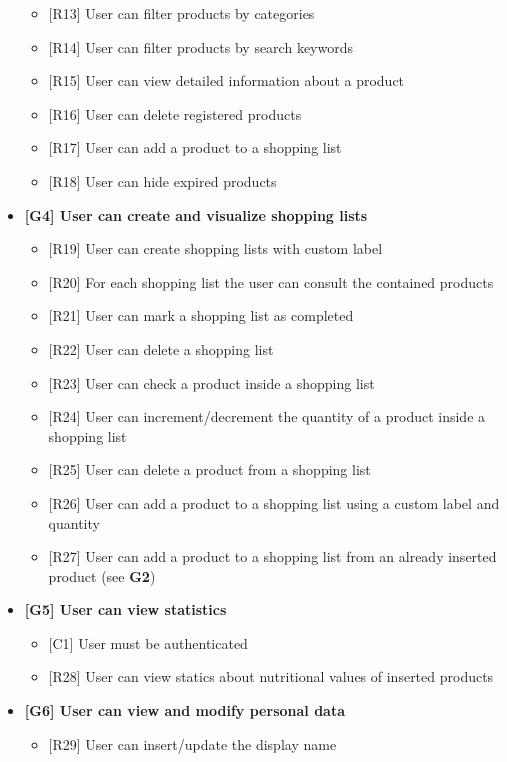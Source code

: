 \begin{itemize}
\begin{itemize}
        \item {[R13] User can filter products by categories}
        \item {[R14] User can filter products by search keywords}
        \item {[R15] User can view detailed information about a product}
        \item {[R16] User can delete registered products}
        \item {[R17] User can add a product to a shopping list}
        \item {[R18] User can hide expired products}
    \end{itemize}
     \item \textbf{[G4] User can create and visualize shopping lists}
    \begin{itemize}
        \item {[R19] User can create shopping lists with custom label}
        \item {[R20] For each shopping list the user can consult the contained products}
        \item {[R21] User can mark a shopping list as completed}
        \item {[R22] User can delete a shopping list}
        \item {[R23] User can check a product inside a shopping list}
        \item {[R24] User can increment/decrement the quantity of a product inside a shopping list}
        \item {[R25] User can delete a product from a shopping list}
        \item {[R26] User can add a product to a shopping list using a custom label and quantity}
        \item {[R27] User can add a product to a shopping list from an already inserted product (see \textbf{G2})}
    \end{itemize}
    \item \textbf{[G5] User can view statistics}
    \begin{itemize}
        \item {[C1] User must be authenticated}
        \item {[R28] User can view statics about nutritional values of inserted products}
    \end{itemize}
    \item \textbf{[G6] User can view and modify personal data}
    \begin{itemize}
        \item {[R29] User can insert/update the display name}

\end{itemize}
\end{itemize}
